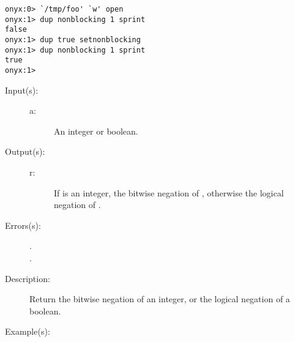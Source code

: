 \begin{description}
\begin{description}
\begin{verbatim}
onyx:0> `/tmp/foo' `w' open
onyx:1> dup nonblocking 1 sprint
false
onyx:1> dup true setnonblocking
onyx:1> dup nonblocking 1 sprint
true
onyx:1>
		\end{verbatim}
	\end{description}
\label{systemdict:not}
\item[{\onyxop{a}{not}{r}}: ]
	\begin{description}\item[]
	\item[Input(s): ]
		\begin{description}\item[]
		\item[a: ]
			An integer or boolean.
		\end{description}
	\item[Output(s): ]
		\begin{description}\item[]
		\item[r: ]
			If  is an integer, the bitwise negation of
			, otherwise the logical negation of .
		\end{description}
	\item[Errors(s): ]
		\begin{description}\item[]
		\item[.]
		\item[.]
		\end{description}
	\item[Description: ]
		Return the bitwise negation of an integer, or the logical
		negation of a boolean.
	\item[Example(s): ]\begin{verbatim}


\end{verbatim}
\end{description}
\end{description}
